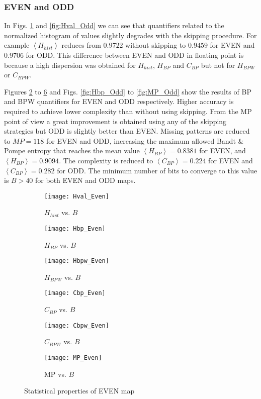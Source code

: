 \subsubsection{EVEN and ODD} \label{sssec:skipp}

In Figs. \ref{fig:Hval_Even} and \ref{fig:Hval_Odd} we can see that quantifiers related to the normalized histogram of values slightly degrades with the skipping procedure.
For example $\left\langle H_{hist}\right\rangle $ reduces from $0.9722$ without skipping to $0.9459$ for EVEN and $0.9706$ for ODD. 
This difference between EVEN and ODD in floating point is because a high dispersion was obtained for $H_{hist}$, $H_{BP}$ and $C_{BP}$ but not for $H_{BPW}$ or $C_{BPW}$.

Figures \ref{fig:Hbp_Even} to \ref{fig:MP_Even} and Figs. \ref{fig:Hbp_Odd} to \ref{fig:MP_Odd} show the results of BP and BPW quantifiers for EVEN and ODD respectively.
Higher accuracy is required to achieve lower complexity than without using skipping.
From the MP point of view a great improvement is obtained using any of the skipping strategies but ODD is slightly better than EVEN.
Missing patterns are reduced to $MP = 118$ for EVEN and ODD, increasing the maximum allowed Bandt \& Pompe entropy that reaches the mean value $\left\langle H_{BP}\right\rangle  = 0.8381$ for EVEN, and $\left\langle H_{BP}\right\rangle  = 0.9094$.
The complexity is reduced to $\left\langle C_{BP}\right\rangle = 0.224$ for EVEN and $\left\langle C_{BP}\right\rangle = 0.282$ for ODD.
The minimum number of bits to converge to this value is $B>40$ for both EVEN and ODD maps.

\begin{figure}[htpb]
	\centering
	\begin{subfigure}[b]{0.49\textwidth}
		\texttt{[image: Hval\_Even]}
		\caption{$H_{hist}$ vs. $B$}
		\label{fig:Hval_Even}
	\end{subfigure}
	\begin{subfigure}[b]{0.49\textwidth}
		\texttt{[image: Hbp\_Even]}
		\caption{$H_{BP}$ vs. $B$}
		\label{fig:Hbp_Even}
	\end{subfigure}
	\begin{subfigure}[b]{0.49\textwidth}
		\texttt{[image: Hbpw\_Even]}
		\caption{$H_{BPW}$ vs. $B$}
		\label{fig:Hbpw_Even}
	\end{subfigure}
	\begin{subfigure}[b]{0.49\textwidth}
		\texttt{[image: Cbp\_Even]}
		\caption{$C_{BP}$ vs. $B$}
		\label{fig:Cbp_Even}
	\end{subfigure}
	\begin{subfigure}[b]{0.49\textwidth}
		\texttt{[image: Cbpw\_Even]}
		\caption{$C_{BPW}$ vs. $B$}
		\label{fig:Cbpw_Even}
	\end{subfigure}
	\begin{subfigure}[b]{0.49\textwidth}
		\texttt{[image: MP\_Even]}
		\caption{MP vs. $B$}
		\label{fig:MP_Even}
	\end{subfigure}
	\caption{Statistical properties of EVEN map}
	\label{fig:EVEN_QuantiB}
\end{figure}

